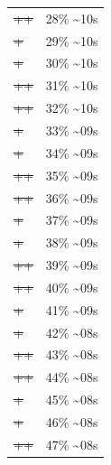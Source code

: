 \documentclass[12pt]{article}
\begin{document}
\begin{center}
\begin{tabular}{ll}
\sout{\sout{\sout{\sout{\sout{\sout{++}}}}}} & 28\% \textasciitilde{}10s\\
\sout{\sout{\sout{\sout{\sout{\sout{\sout{+}}}}}}} & 29\% \textasciitilde{}10s\\
\sout{\sout{\sout{\sout{\sout{\sout{\sout{+}}}}}}} & 30\% \textasciitilde{}10s\\
\sout{\sout{\sout{\sout{\sout{\sout{\sout{++}}}}}}} & 31\% \textasciitilde{}10s\\
\sout{\sout{\sout{\sout{\sout{\sout{\sout{++}}}}}}} & 32\% \textasciitilde{}10s\\
\sout{\sout{\sout{\sout{\sout{\sout{\sout{\sout{+}}}}}}}} & 33\% \textasciitilde{}09s\\
\sout{\sout{\sout{\sout{\sout{\sout{\sout{\sout{+}}}}}}}} & 34\% \textasciitilde{}09s\\
\sout{\sout{\sout{\sout{\sout{\sout{\sout{\sout{++}}}}}}}} & 35\% \textasciitilde{}09s\\
\sout{\sout{\sout{\sout{\sout{\sout{\sout{\sout{++}}}}}}}} & 36\% \textasciitilde{}09s\\
\sout{\sout{\sout{\sout{\sout{\sout{\sout{\sout{\sout{+}}}}}}}}} & 37\% \textasciitilde{}09s\\
\sout{\sout{\sout{\sout{\sout{\sout{\sout{\sout{\sout{+}}}}}}}}} & 38\% \textasciitilde{}09s\\
\sout{\sout{\sout{\sout{\sout{\sout{\sout{\sout{\sout{++}}}}}}}}} & 39\% \textasciitilde{}09s\\
\sout{\sout{\sout{\sout{\sout{\sout{\sout{\sout{\sout{++}}}}}}}}} & 40\% \textasciitilde{}09s\\
\sout{\sout{\sout{\sout{\sout{\sout{\sout{\sout{\sout{\sout{+}}}}}}}}}} & 41\% \textasciitilde{}09s\\
\sout{\sout{\sout{\sout{\sout{\sout{\sout{\sout{\sout{\sout{+}}}}}}}}}} & 42\% \textasciitilde{}08s\\
\sout{\sout{\sout{\sout{\sout{\sout{\sout{\sout{\sout{\sout{++}}}}}}}}}} & 43\% \textasciitilde{}08s\\
\sout{\sout{\sout{\sout{\sout{\sout{\sout{\sout{\sout{\sout{++}}}}}}}}}} & 44\% \textasciitilde{}08s\\
\sout{\sout{\sout{\sout{\sout{\sout{\sout{\sout{\sout{\sout{\sout{+}}}}}}}}}}} & 45\% \textasciitilde{}08s\\
\sout{\sout{\sout{\sout{\sout{\sout{\sout{\sout{\sout{\sout{\sout{+}}}}}}}}}}} & 46\% \textasciitilde{}08s\\
\sout{\sout{\sout{\sout{\sout{\sout{\sout{\sout{\sout{\sout{\sout{++}}}}}}}}}}} & 47\% \textasciitilde{}08s\\

\end{tabular}
\end{center}
\end{document}
